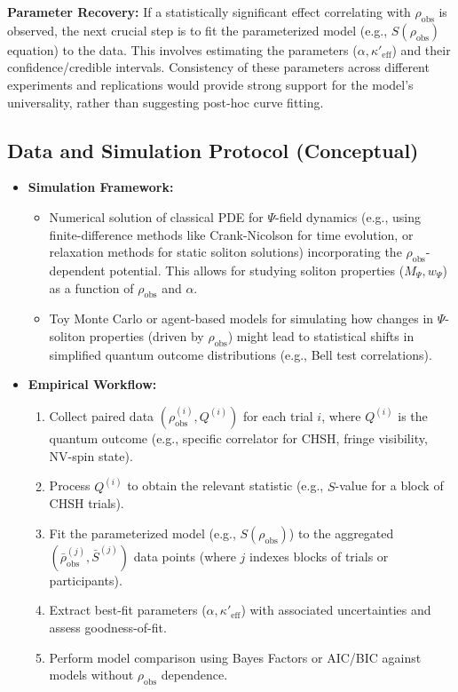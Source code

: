 \documentclass[11pt, a4paper]{book}
\begin{document}
\textbf{Parameter Recovery:} If a statistically significant effect correlating with $\rho_{\text{obs}}$ is observed, the next crucial step is to fit the parameterized model (e.g., $S(\rho_{\text{obs}})$ equation) to the data. This involves estimating the parameters ($\alpha, \kappa'_{\text{eff}}$) and their confidence/credible intervals. Consistency of these parameters across different experiments and replications would provide strong support for the model's universality, rather than suggesting post-hoc curve fitting.

\subsection{Data and Simulation Protocol (Conceptual)}
\label{ssec:empiricalpredictions_datasim}
\begin{itemize}
    \item \textbf{Simulation Framework:}
    \begin{itemize}
        \item Numerical solution of classical PDE for $\Psi$-field dynamics (e.g., using finite-difference methods like Crank-Nicolson for time evolution, or relaxation methods for static soliton solutions) incorporating the $\rho_{\text{obs}}$-dependent potential. This allows for studying soliton properties ($M_\Psi, w_\Psi$) as a function of $\rho_{\text{obs}}$ and $\alpha$.
        \item Toy Monte Carlo or agent-based models for simulating how changes in $\Psi$-soliton properties (driven by $\rho_{\text{obs}}$) might lead to statistical shifts in simplified quantum outcome distributions (e.g., Bell test correlations).
    \end{itemize}
    \item \textbf{Empirical Workflow:}
    \begin{enumerate}
        \item Collect paired data $(\rho_{\text{obs}}^{(i)}, Q^{(i)})$ for each trial $i$, where $Q^{(i)}$ is the quantum outcome (e.g., specific correlator for CHSH, fringe visibility, NV-spin state).
        \item Process $Q^{(i)}$ to obtain the relevant statistic (e.g., $S$-value for a block of CHSH trials).
        \item Fit the parameterized model (e.g., $S(\rho_{\text{obs}})$) to the aggregated $(\bar{\rho}_{\text{obs}}^{(j)}, \bar{S}^{(j)})$ data points (where $j$ indexes blocks of trials or participants).
        \item Extract best-fit parameters ($\alpha, \kappa'_{\text{eff}}$) with associated uncertainties and assess goodness-of-fit.
        \item Perform model comparison using Bayes Factors or AIC/BIC against models without $\rho_{\text{obs}}$ dependence.
    \end{enumerate}
\end{itemize}
\end{document}
